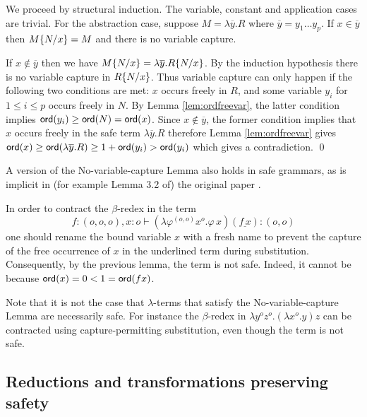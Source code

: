 \proof
  We proceed by structural induction. The variable, constant and
  application cases are trivial. For the abstraction case, suppose $M = \lambda \overline{y}. R$ where $\overline{y} = y_1
  \ldots y_p$. If $x \in \overline{y}$ then $M \{N/x \} = M$ and there is no variable capture.

 If $x \not\in \overline{y}$ then we have $M \{N/x \} = \lambda \overline{y} . R \{N/x \}$.  By the induction hypothesis there is no variable capture in $R \{N/x \}$.  Thus variable capture can only happen if the following two conditions are met: $x$ occurs freely in $R$, and some variable $y_i$ for $1 \leq i \leq p$ occurs freely in $N$. By Lemma \ref{lem:ordfreevar}, the latter condition  implies ${\sf ord}(y_i) \geq {\sf ord}(N) = {\sf ord}(x)$.  Since $x \not \in \overline{y}$, the former condition implies that $x$ occurs freely in the safe term $\lambda \overline{y}. R$
  therefore Lemma \ref{lem:ordfreevar} gives $ {\sf ord}(x) \geq
  {\sf ord}(\lambda \overline{y} . R) \geq 1+ {\sf ord}(y_i) > {\sf ord}(y_i)$ which  gives a contradiction.
\qed


\begin{remark}
  A version of the No-variable-capture Lemma also holds in safe
  grammars, as is implicit in (for example Lemma 3.2 of) the original
  paper \cite{KNU02}.
\end{remark}

\begin{example}
  In order to contract the $\beta$-redex in the term
\[f:(o,o,o),x:o
  \vdash (\lambda \varphi^{(o,o)} x^o . \varphi \, x) (\underline{f \,
    x}) : (o,o)\] one should rename the bound variable $x$ with a fresh name to
  prevent the capture of the free occurrence of $x$ in the underlined term during substitution. Consequently, by the previous lemma,
  the term is not safe. Indeed, it cannot be because ${\sf ord}(x) = 0 < 1
  = {\sf ord}(f x)$.
\end{example}

Note that it is not the case that $\lambda$-terms
that satisfy the No-variable-capture Lemma are necessarily safe. For instance the $\beta$-redex in $\lambda y^o
z^o. (\lambda x^o .y) z$ can be contracted using capture-permitting
substitution, even though the term is not safe.

\subsection*{Reductions and transformations preserving safety}

